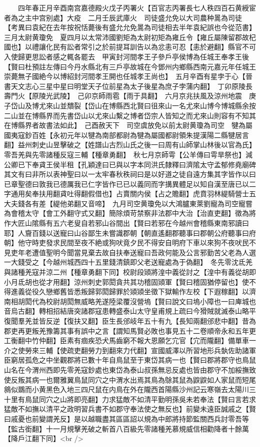 　　四年春正月辛酉南宫嘉德殿火戊子丙署火【百官志丙署長七人秩四百石黄綬宦者為之主中宫别處】大疫　二月壬辰武庫火　司徒盛允免以大司農种暠為司徒　【考異曰袁紀在去年按祝恬薨後有盛允允免暠為司徒相去半年袁紀誤也今從范書】　三月太尉黄瓊免　夏四月以太常沛國劉矩為太尉初矩為雍丘令【雍丘屬陳留郡故杞國也】以禮讓化民有訟者常引之於前提耳訓告以為忿恚可忍【恚於避翻】縣官不可入使歸更思訟者感之輒各罷去　甲寅封河間孝王子參戶亭侯博為任城王奉孝王後【賢曰杜預註左傳曰今丹水縣北有三戶亭故城在今鄧州内鄉縣西南元嘉元年任城王崇薨無子國絶今以博紹封河間孝王開也任城孝王尚也】　五月辛酉有星孛于心【晉書天文志心三星中星曰明堂天子位前星為太子後星為庶子孛蒲内翻】　丁卯原陵長壽門火【原陵光武陵】　己卯京師雨雹【雨于具翻】　六月京兆扶風及涼州地震　庚子岱山及博尤來山並穨裂【岱山在博縣西北賢曰徂來山一名尤來山博今博城縣余按二山並在博縣界而先書岱山以尤來山繫之博者岱宗人皆知之而尤來山則容有不知其在博縣界者故書法如此】　己酉赦天下　司空虞放免以前太尉黄瓊為司空　犍為屬國夷寇鈔百姓【永初元年以犍為南部都尉為犍為屬國都尉領朱提漢陽二縣犍居言翻】益州刺史山昱擊破之【姓譜山古烈山氏之後一曰周有山師掌山林後以官為氏】　零吾羌與先零諸種反寇三輔【種章勇翻】　秋七月京師雩【公羊傳曰雩旱祭也】減公卿已下奉貣王侯半租【孔穎達曰已與以字本同洪氏隸釋曰濟隂太守孟郁修堯廟碑其文有曰非所以表神聖曰以一太牢春秋秩祠曰是以好道之徒自遠方集其字皆作以曰已章聖德曰敦我已德厲我已仁字皆作已已以義同而字搆異體足以知自漢至唐已以二字通用矣奉扶用翻貣吐得翻假借也】占賣關内侯【占之贍翻】虎賁羽林緹騎營士五大夫錢各有差【緹他弟翻又音啼】　九月司空黄瓊免以大鴻臚東萊劉寵為司空寵嘗為會稽太守【會工外翻守式又翻】簡除煩苛禁察非法郡中大治【治直吏翻】徵為將作大匠山隂縣有五六老叟自若邪山谷間出【賢曰若邪在今越州會稽縣東南邪讀曰耶】人齎百錢以送寵曰山谷鄙生未嘗識郡朝【朝直遙翻郡聽事曰郡朝公府聽事曰府朝】他守時吏發求民間至夜不絶或狗吠竟夕民不得安自明府下車以來狗不夜吠民不見吏年老遭值聖明今聞當見棄去故自扶奉送寵曰吾政何能及公言邪勤苦父老為人選一大錢受之【今越州城西四十五里錢清鎮即父老送寵處為于偽翻】　冬先零沈氐羌與諸種羌寇并涼二州【種章勇翻下同】校尉段熲將湟中義從討之【湟中有義從胡即小月氐胡也從才用翻】涼州刺史郭閎貪共其功稽固熲軍【賢曰稽固猶停留也】使不得進義從役久戀鄉舊皆悉叛歸郭閎歸罪於熲熲坐徵下獄輸作左校【下遐稼翻】以濟南相胡閎代為校尉胡閎無威略羌遂陸梁覆沒營塢【賢曰說文曰塢小障也一曰庳城也音烏古翻】轉相招結唐突諸郡寇患轉盛泰山太守皇甫規上疏曰今猾賊就滅泰山略平復聞羣羌並皆反逆【復扶又翻】臣生長邠岐年五十有九【長知兩翻邠悲中翻】昔為郡吏再更叛羌豫籌其事有誤中之言【謂知馬賢必敗也事見五十二卷順帝永和五年更工衡翻中竹仲翻】臣素有痼疾恐犬馬齒窮不報大恩願乞宂官【宂而隴翻】備單車一介之使勞來三輔【使疏吏翻勞力到翻來力代翻】宣國威澤以所習地形兵埶佐助諸軍臣窮居孤危之中坐觀郡將已數十年自鳥鼠至于東岱其病一也【賢曰郡將郡守也鳥鼠山名在今渭州西即先零羌寇鈔處也東岱為泰山叔孫無忌反處也皆由郡守不加綏撫致使反叛其病一也爾雅翼鳥鼠同穴之中渭水出焉其鳥為鵌其鼠為鼵鼵如人家鼠而短尾䳜似鵽而小黄黑色入地三四尺鼠在内鳥在外在隴西首陽縣沙州記云寒嶺去太陽川三十里有鳥鼠同穴之山將即亮翻】力求猛敵不如清平勤明孫吳未若奉法【賢曰言若求猛敵不如撫以清平之政明習兵書不如郡守奉法使之無反也】前變未遠臣誠戚之【賢曰戚憂也前變謂羌反】是以越職盡其區區詔以規為中郎將持節監關西兵討零吾等【監古銜翻】十一月規擊羌破之斬首八百級先零諸種羌慕規威信相勸降者十餘萬【降戶江翻下同】<br />
